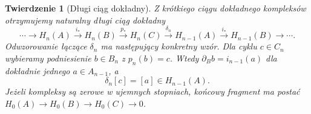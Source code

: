 \documentclass[11pt,a4paper,oneside]{report}
\theoremstyle{plain}
\newtheorem{twierdzenie}{Twierdzenie}[section]
\theoremstyle{definition}
\theoremstyle{remark}
\begin{document}
\begin{twierdzenie}[Długi ciąg dokładny]
\label{thm:les-homologia}
Z krótkiego ciągu dokładnego kompleksów
otrzymujemy naturalny długi ciąg dokładny
\begin{equation}\label{eq:les-homologia}
 \cdots\longrightarrow H_n(A)
 \xrightarrow{i_*}H_n(B)
 \xrightarrow{p_*}H_n(C)
 \xrightarrow{\delta_n}H_{n-1}(A)
 \xrightarrow{i_*}H_{n-1}(B)
 \longrightarrow\cdots.
\end{equation}
Odwzorowanie \emph{łączące} $\delta_n$ ma następujący
konkretny wzór. Dla cyklu $c\in C_n$ wybieramy
podniesienie $b\in B_n$ z $p_n(b)=c$.
Wtedy $\partial_B b=i_{n-1}(a)$ dla dokładnie
jednego $a\in A_{n-1}$, a
\begin{equation}\label{eq:delta-wzor}
 \delta_n[c]=[a]\in H_{n-1}(A).
\end{equation}
Jeżeli kompleksy są zerowe w ujemnych stopniach,
końcowy fragment ma postać
$H_0(A)\to H_0(B)\to H_0(C)\to0$.
\end{twierdzenie}
\end{document}

